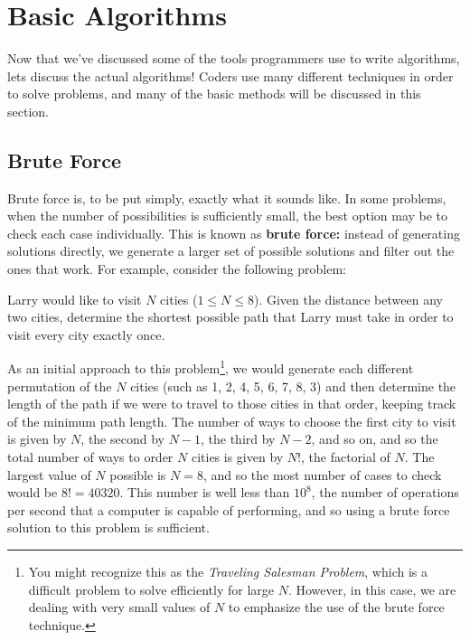 \chapter{Basic Algorithms}

Now that we've discussed some of the tools programmers use to write algorithms, lets discuss the actual algorithms!  Coders use many different techniques in order to solve problems, and many of the basic methods will be discussed in this section.

\section{Brute Force}

Brute force is, to be put simply, exactly what it sounds like.  In some problems, when the number of possibilities is sufficiently small, the best option may be to check each case individually.  This is known as \textbf{brute force:} instead of generating solutions directly, we generate a larger set of possible solutions and filter out the ones that work.
For example, consider the following problem:

\begin{Problem}
Larry would like to visit $ N $ cities ($1 \leq N \leq 8$).  Given the distance between any two cities, determine the shortest possible path that Larry must take in order to visit every city exactly once.
\end{Problem}

As an initial approach to this problem\footnote{You might recognize this as the \textit{Traveling Salesman Problem}, which is a difficult problem to solve efficiently for large $ N $.  However, in this case, we are dealing with very small values of $ N $ to emphasize the use of the brute force technique.}, we would generate each different permutation of the $ N $ cities (such as 1, 2, 4, 5, 6, 7, 8, 3) and then determine the length of the path if we were to travel to those cities in that order, keeping track of the minimum path length.  The number of ways to choose the first city to visit is given by $ N $, the second by $ N - 1 $, the third by $ N - 2 $, and so on, and so the total number of ways to order $ N $ cities is given by $ N! $, the factorial of $ N $.  The largest value of $ N $ possible is $ N = 8 $, and so the most number of cases to check would be $ 8! = 40320 $.  This number is well less than $ 10^8 $, the number of operations per second that a computer is capable of performing, and so using a brute force solution to this problem is sufficient.

